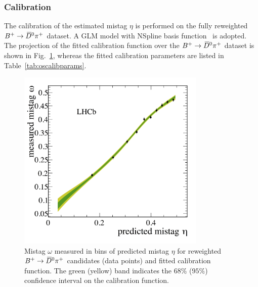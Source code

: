 \subsubsection{Calibration}
\label{sec:tagging:OScalib:calibration}
The calibration of the estimated mistag $\eta$ is performed on the fully reweighted $B^+\rightarrow\kern 0.2em\overline{\kern -0.2em D}{}^0\pi^+$ dataset. 
A GLM model with NSpline basis function~\cite{EPM} is adopted.
The projection of the fitted calibration function over the $B^+\rightarrow\kern 0.2em\overline{\kern -0.2em D}{}^0\pi^+$ dataset is shown in Fig.~\ref{fig:oscalibplot},
whereas the fitted calibration parameters are listed in Table~\ref{tab:oscalibparams}.
\begin{figure}[htbp]
        \begin{center}
                \includegraphics[width=0.80\textwidth]{04Flavourtagging/figs/OS_Combination_Calibration_Data.png}
        \end{center}
        \vspace{-5mm}
        \caption{Mistag $\omega$ measured in bins of predicted mistag $\eta$ for reweighted $B^+\rightarrow\kern 0.2em\overline{\kern -0.2em D}{}^0\pi^+$ candidates (data points) and fitted calibration function. The green (yellow) band indicates the $68\%$ ($95\%$) confidence interval on the calibration function.}
        \label{fig:oscalibplot}
\end{figure}
